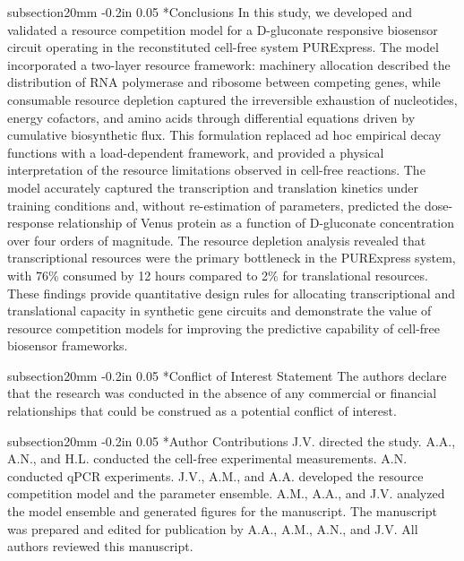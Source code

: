\documentclass[12pt]{article}
\makeatletter
\renewcommand\section{\@startsection
	{subsection}{2}{0mm}
	{-0.2in}
	{0.05\baselineskip}
	{\normalfont\large\bfseries}}
\makeatother
\begin{document}
\section*{Conclusions}
In this study, we developed and validated a resource competition model for a D-gluconate responsive biosensor circuit operating in the reconstituted cell-free system PURExpress. The model incorporated a two-layer resource framework: machinery allocation described the distribution of RNA polymerase and ribosome between competing genes, while consumable resource depletion captured the irreversible exhaustion of nucleotides, energy cofactors, and amino acids through differential equations driven by cumulative biosynthetic flux. This formulation replaced ad hoc empirical decay functions with a load-dependent framework, and provided a physical interpretation of the resource limitations observed in cell-free reactions. The model accurately captured the transcription and translation kinetics under training conditions and, without re-estimation of parameters, predicted the dose-response relationship of Venus protein as a function of D-gluconate concentration over four orders of magnitude. The resource depletion analysis revealed that transcriptional resources were the primary bottleneck in the PURExpress system, with 76\% consumed by 12 hours compared to 2\% for translational resources. These findings provide quantitative design rules for allocating transcriptional and translational capacity in synthetic gene circuits and demonstrate the value of resource competition models for improving the predictive capability of cell-free biosensor frameworks.

\clearpage

\section*{Conflict of Interest Statement}
The authors declare that the research was conducted in the absence of any commercial or financial relationships that could be construed as a potential conflict of interest.

\section*{Author Contributions}
J.V. directed the study. A.A., A.N., and H.L. conducted the cell-free experimental measurements. A.N. conducted qPCR experiments. J.V., A.M., and A.A. developed the resource competition model and the parameter ensemble. A.M., A.A., and J.V. analyzed the model ensemble and generated figures for the manuscript. The manuscript was prepared and edited for publication by A.A., A.M., A.N., and J.V. All authors reviewed this manuscript.
\end{document}
